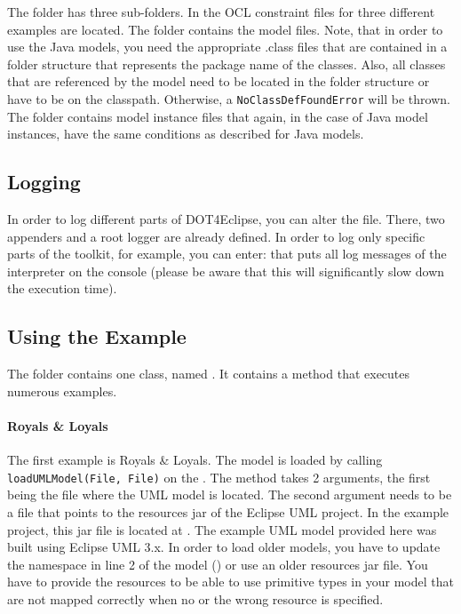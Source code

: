 The  folder has three sub-folders. In  the OCL constraint files for three different examples are located. The  folder contains the model files. Note, that in order to use the Java models, you need the appropriate .class files that are contained in a folder structure that represents the package name of the classes. Also, all classes that are referenced by the model need to be located in the folder structure or have to be on the classpath. Otherwise, a \lstinline[breaklines=true]{NoClassDefFoundError} will be thrown. The  folder contains model instance files that again, in the case of Java model instances, have the same conditions as described for Java models.

\subsection{Logging}

In order to log different parts of \acl{DOT4Eclipse}, you can alter the  file. There, two appenders and a root logger are already defined. In order to log only specific parts of the toolkit, for example, you can enter:  that puts all log messages of the interpreter on the console (please be aware that this will significantly slow down the execution time).

\subsection{Using the Example}

The  folder contains one class, named . It contains a  method that executes numerous examples. 

\paragraph{Royals \& Loyals}
The first example is Royals \& Loyals. The model is loaded by calling \lstinline[breaklines=true]{loadUMLModel(File, File)} on the . The method takes 2 arguments, the first being the file where the UML model is located. The second argument needs to be a file that points to the resources jar of the Eclipse UML project. In the example project, this jar file is located at . The example UML model provided here was built using Eclipse UML 3.x. In order to load older models, you have to update the namespace in line 2 of the model () or use an older resources jar file. You have to provide the resources to be able to use primitive types in your model that are not mapped correctly when no or the wrong resource is specified.

